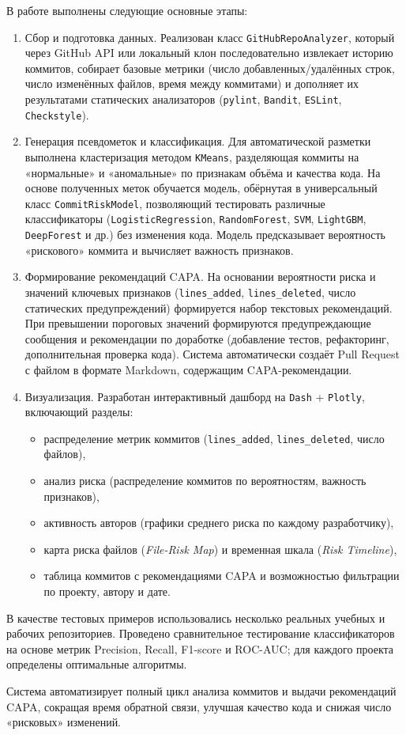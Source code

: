 {	В работе выполнены следующие основные этапы:
\begin{enumerate}
	\item Сбор и подготовка данных. Реализован класс \texttt{GitHubRepoAnalyzer}, который через GitHub API или локальный клон последовательно извлекает историю коммитов, собирает базовые метрики (число добавленных/удалённых строк, число изменённых файлов, время между коммитами) и дополняет их результатами статических анализаторов (\texttt{pylint}, \texttt{Bandit}, \texttt{ESLint}, \texttt{Checkstyle}).
	\item Генерация псевдометок и классификация. Для автоматической разметки выполнена кластеризация методом \texttt{KMeans}, разделяющая коммиты на «нормальные» и «аномальные» по признакам объёма и качества кода. На основе полученных меток обучается модель, обёрнутая в универсальный класс \texttt{CommitRiskModel}, позволяющий тестировать различные классификаторы (\texttt{LogisticRegression}, \texttt{RandomForest}, \texttt{SVM}, \texttt{LightGBM}, \texttt{DeepForest} и др.) без изменения кода. Модель предсказывает вероятность «рискового» коммита и вычисляет важность признаков.
	\item Формирование рекомендаций CAPA. На основании вероятности риска и значений ключевых признаков (\texttt{lines\_added}, \texttt{lines\_deleted}, число статических предупреждений) формируется набор текстовых рекомендаций. При превышении пороговых значений формируются предупреждающие сообщения и рекомендации по доработке (добавление тестов, рефакторинг, дополнительная проверка кода). Система автоматически создаёт Pull Request с файлом в формате Markdown, содержащим CAPA-рекомендации.
	\item Визуализация. Разработан интерактивный дашборд на \texttt{Dash} + \texttt{Plotly}, включающий разделы:
	\begin{itemize}
		\item распределение метрик коммитов (\texttt{lines\_added}, \texttt{lines\_deleted}, число файлов),
		\item анализ риска (распределение коммитов по вероятностям, важность признаков),
		\item активность авторов (графики среднего риска по каждому разработчику),
		\item карта риска файлов (\textit{File-Risk Map}) и временная шкала (\textit{Risk Timeline}),
		\item таблица коммитов с рекомендациями CAPA и возможностью фильтрации по проекту, автору и дате.
	\end{itemize}
\end{enumerate}
	
	В качестве тестовых примеров использовались несколько реальных учебных и рабочих репозиториев. Проведено сравнительное тестирование классификаторов на основе метрик Precision, Recall, F1-score и ROC-AUC; для каждого проекта определены оптимальные алгоритмы.  
	
	Система автоматизирует полный цикл анализа коммитов и выдачи рекомендаций CAPA, сокращая время обратной связи, улучшая качество кода и снижая число «рисковых» изменений.}%
